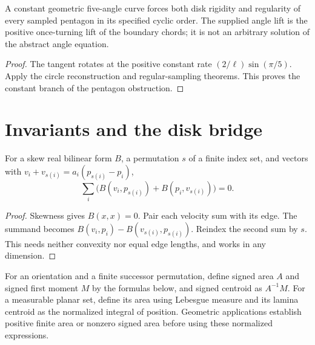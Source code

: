 \begin{proposition}
\label{prop:constant-fifth-rigidity}
\leanok
{}
A constant geometric five-angle curve forces both disk rigidity and
regularity of every sampled pentagon in its specified cyclic order.
The supplied angle lift is the positive once-turning lift of the boundary
chords; it is not an arbitrary solution of the abstract angle equation.
\end{proposition}
\begin{proof}
\leanok
The tangent rotates at the positive constant rate
$(2/\ell)\sin(\pi/5)$. Apply the circle reconstruction and regular-sampling
theorems. This proves the constant branch of the pentagon obstruction.
\end{proof}

\section{Invariants and the disk bridge}

\begin{lemma}
\label{lem:area-rate}
\leanok
For a skew real bilinear form $B$, a permutation $s$ of a finite index
set, and vectors with $v_i+v_{s(i)}=a_i(p_{s(i)}-p_i)$,
\[
 \sum_i\bigl(B(v_i,p_{s(i)})+B(p_i,v_{s(i)})\bigr)=0.
\]
\end{lemma}
\begin{proof}
\leanok
Skewness gives $B(x,x)=0$. Pair each velocity sum with its edge.
The summand becomes $B(v_i,p_i)-B(v_{s(i)},p_{s(i)})$.
Reindex the second sum by $s$. This needs neither convexity nor equal
edge lengths, and works in any dimension.
\end{proof}

\begin{definition}
\label{def:moments}
\leanok
{}
For an orientation and a finite successor permutation, define signed area
$A$ and signed first moment $M$ by the formulas below, and signed centroid
as $A^{-1}M$. For a measurable planar set, define its area using Lebesgue
measure and its lamina centroid as the normalized integral of position.
Geometric applications establish positive finite area or nonzero signed
area before using these normalized expressions.
\end{definition}

